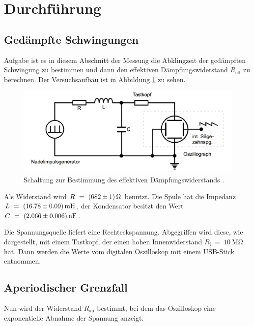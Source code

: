  \section{Durchführung}
\label{sec:Durchführung}

\subsection{Gedämpfte Schwingungen}
\label{sec:durchgedschw}

Aufgabe ist es in diesem Abschnitt der Messung die Abklingzeit der gedämpften
Schwingung zu bestimmen und dann den effektiven Dämpfungswiderstand $R_{\text{eff}}$
zu berechnen.
Der Versuchsaufbau ist in Abbildung \ref{fig:schalta} zu sehen.

\begin{figure}[h]
  \centering
  \includegraphics[width = \textwidth]{Schaltunga.pdf}
  \caption{Schaltung zur Bestimmung des effektiven Dämpfungswiderstands \cite{anleitung}.}
  \label{fig:schalta}
\end{figure}

Als Widerstand wird $R~=~\SI{682 +- 1}{\ohm}$ benutzt. Die Spule hat
die Impedanz $L~=~\SI{16.78 +- 0.09}{\milli\henry}$, der Kondensator besitzt
den Wert $C~=~\SI{2.066 +- 0.006}{\nano\farad}$.

Die Spannungsquelle liefert eine Rechteckspannung. Abgegriffen wird diese,
wie dargestellt, mit einem Tastkopf, der einen hohen Innenwiderstand
$R_{\text{i}}~=~\SI{10}{\mega\ohm}$ hat. Dann werden die Werte vom digitalen
Oszilloskop mit einem USB-Stick entnommen.

\subsection{Aperiodischer Grenzfall}

Nun wird der Widerstand $R_{\text{ap}}$ bestimmt, bei dem das Oszilloskop
eine exponentielle Abnahme der Spannung anzeigt.

